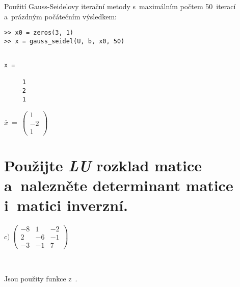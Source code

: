 \documentclass[a4paper,10pt]{article}
\begin{document}
\newpage

\par Použití Gauss-Seidelovy iterační metody s~maximálním počtem 50~iterací a~prázdným
počátečním výsledkem:

\begin{verbatim}
>> x0 = zeros(3, 1)
>> x = gauss_seidel(U, b, x0, 50)
\end{verbatim}

\begin{minipage}[t]{.5\textwidth}
\begin{verbatim}

x =

     1
    -2
     1

\end{verbatim}
\end{minipage}%
\begin{minipage}[t]{.5\textwidth}

\bigskip
\bigskip

$
\overline{x}~=~
\left( \begin{array}{r}
  1 \\
 -2 \\
  1
\end{array} \right)
$
\vfill
\end{minipage}



\newpage
\section{Použijte \emph{LU} rozklad matice a~nalezněte determinant matice i~matici inverzní.}

$
c)~
\left( \begin{array}{rrr}
-8 &  1 & -2 \\
 2 & -6 & -1 \\
-3 & -1 &  7 
\end{array} \right)
$

\par {~}


\par Jsou použity funkce z~. \\


\end{document}
